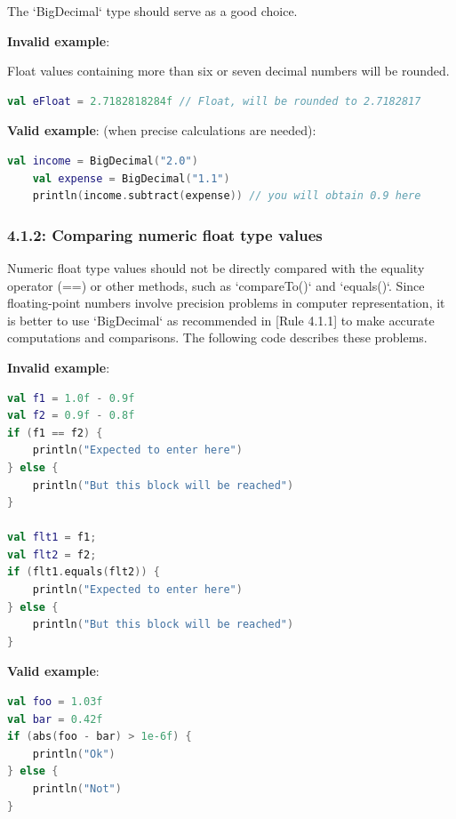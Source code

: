 {{{{The `BigDecimal` type should serve as a good choice.



\textbf{Invalid example}:

Float values containing more than six or seven decimal numbers will be rounded.

\begin{lstlisting}[language=Kotlin]
 val eFloat = 2.7182818284f // Float, will be rounded to 2.7182817
\end{lstlisting}


\textbf{Valid example}: (when precise calculations are needed): 

\begin{lstlisting}[language=Kotlin]
    val income = BigDecimal("2.0")
    val expense = BigDecimal("1.1")
    println(income.subtract(expense)) // you will obtain 0.9 here
\end{lstlisting}


\subsubsection*{\textbf{4.1.2: Comparing numeric float type values}}
\leavevmode\newline

\label{sec:4.1.2}

Numeric float type values should not be directly compared with the equality operator (==) or other methods, such as `compareTo()` and `equals()`. Since floating-point numbers involve precision problems in computer representation, it is better to use `BigDecimal` as recommended in [Rule 4.1.1] to make accurate computations and comparisons. The following code describes these problems.



\textbf{Invalid example}:

\begin{lstlisting}[language=Kotlin]
val f1 = 1.0f - 0.9f
val f2 = 0.9f - 0.8f
if (f1 == f2) {
    println("Expected to enter here")
} else {
    println("But this block will be reached")
}

val flt1 = f1;
val flt2 = f2;
if (flt1.equals(flt2)) {
    println("Expected to enter here")
} else {
    println("But this block will be reached")
} 
\end{lstlisting}


\textbf{Valid example}:



\begin{lstlisting}[language=Kotlin]
val foo = 1.03f
val bar = 0.42f
if (abs(foo - bar) > 1e-6f) {
    println("Ok")
} else {
    println("Not")
}
\end{lstlisting}


}}}}
